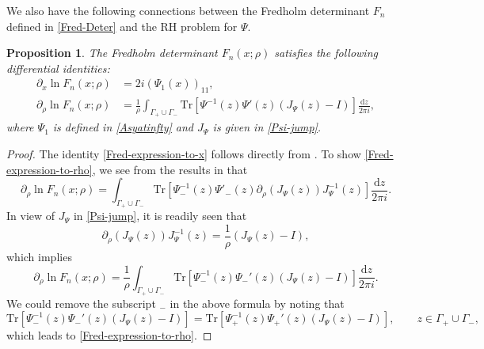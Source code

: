 \documentclass[11pt,a4paper]{article}
\newtheorem{pro}[thm]{Proposition}
\numberwithin{equation}{section}
\begin{document}
We also have the following connections between the Fredholm determinant $F_n$ defined in \eqref{Fred-Deter} and the RH problem for $\Psi$.
\begin{pro}
The Fredholm determinant $F_n(x;\rho)$ satisfies the following differential identities:
\begin{align}\label{Fred-expression-to-x}
\partial_x\ln{F_n(x;\rho)}&=2i(\Psi_1(x))_{11},
\\
\label{Fred-expression-to-rho}
\partial_{\rho}\ln{F_n(x;\rho)}&=\frac{1}{\rho}\int_{\Gamma_+\cup\Gamma_-}
\mathrm{Tr}\left[\Psi^{-1}(z)\Psi'(z)(J_{\Psi}(z)-I)\right]\frac{\mathrm{d}z}{2\pi i},
\end{align}
where $\Psi_1$ is defined in \eqref{Asyatinfty} and $J_{\Psi}$ is given in \eqref{Psi-jump}.
\end{pro}
\begin{proof}
The identity \eqref{Fred-expression-to-x} follows directly from \cite[Equations (2.19) and (2.25)]{CCG2021}. To show \eqref{Fred-expression-to-rho}, we see from the results in \cite[Section 5.1]{Ber} that
\begin{equation}\label{eq:BCdiff}
\partial_{\rho}\ln{F_n(x;\rho)}=\int_{\Gamma_+\cup\Gamma_-}\mathrm{Tr}
\left[\Psi^{-1}_-(z)\Psi'_-(z)\partial_{\rho}(J_{\Psi}(z))J_{\Psi}^{-1}(z)\right]
\frac{\mathrm{d}z}{2\pi i}.
\end{equation}
In view of $J_{\Psi}$ in \eqref{Psi-jump}, it is readily seen that
$$
\partial_{\rho}(J_{\Psi}(z))J_{\Psi}^{-1}(z)=\frac{1}{\rho}(J_{\Psi}(z)-I),
$$
which implies
$$
\partial_{\rho}\ln{F_n(x;\rho)}=\frac{1}{\rho}\int_{\Gamma_+\cup\Gamma_-}
\mathrm{Tr}\left[\Psi_-^{-1}(z)\Psi_-'(z)(J_{\Psi}(z)-I)\right]\frac{\mathrm{d}z}{2\pi i}.
$$
We could remove the subscript $_{-}$ in the above formula by noting that
\begin{equation*}
\mathrm{Tr}\left[\Psi_-^{-1}(z)\Psi_-'(z)(J_{\Psi}(z)-I)\right]=\mathrm{Tr}\left[\Psi_+^{-1}(z)\Psi_+'(z)(J_{\Psi}(z)-I)\right], \qquad z\in \Gamma_+\cup\Gamma_-,
\end{equation*}
which leads to \eqref{Fred-expression-to-rho}.
\end{proof}
\end{document}
